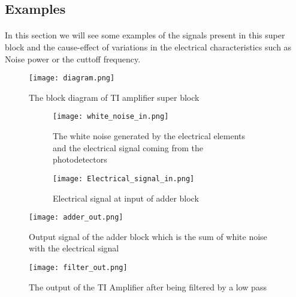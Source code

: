 \subsection{Examples}
\paragraph*{} In this section we will see some examples of the signals present in this super block and the cause-effect of variations in the electrical characteristics such as Noise power or the cuttoff frequency.
\begin{figure}
	\centering
	\texttt{[image: diagram.png]}
	\caption{The block diagram of TI amplifier super block}
	\label{fig:blocks}
\end{figure}

\begin{figure}%
	\begin{subfigure}[h]{0.4\textwidth}
		\texttt{[image: white\_noise\_in.png]}
		\caption{The white noise generated by the electrical elements and the electrical signal coming from the photodetectors}
		\label{fig:White Noise}
	\end{subfigure}
	\begin{subfigure}[h]{0.4\textwidth}
		\texttt{[image: Electrical\_signal\_in.png]}
		\caption{Electrical signal at input of adder block}
		\label{fig:Adder In}
	\end{subfigure}
	\centering
	\texttt{[image: adder\_out.png]}
	\caption{Output signal of the adder block which is the sum of white noise with the electrical signal}
	\label{fig:Adder Out}
\end{figure}
\begin{figure}
	\centering
	\texttt{[image: filter\_out.png]}
	\caption{The output of the TI Amplifier after being filtered by a low pass}
	\label{fig:TI_out}
\end{figure}


